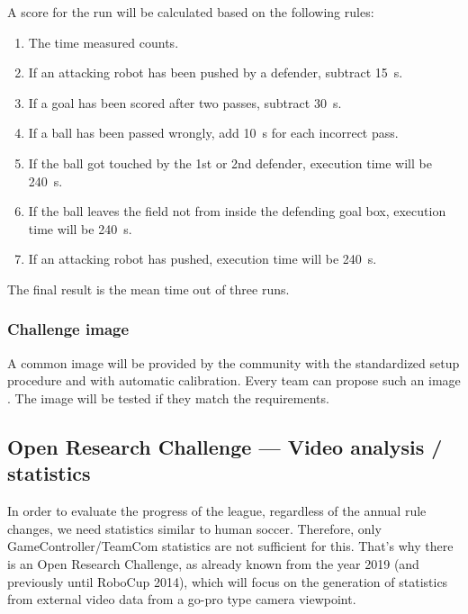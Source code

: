         A score for the run will be calculated based on the following rules:

        \begin{enumerate}
            \item The time measured counts.
            \item If an attacking robot has been pushed by a defender, subtract \qty{15}{\second}.
            \item If a goal has been scored after two passes, subtract \qty{30}{\second}.
            \item If a ball has been passed wrongly, add \qty{10}{\second} for each incorrect pass.
            \item If the ball got touched by the 1st or 2nd defender, execution time will be \qty{240}{\second}.
            \item If the ball leaves the field not from inside the defending goal box, execution time will be \qty{240}{\second}.
            \item If an attacking robot has pushed, execution time will be \qty{240}{\second}.
        \end{enumerate}

        The final result is the mean time out of three runs.

    \subsubsection{Challenge image}
        \label{sec:Challenge_image}
        A common image will be provided by the community with the standardized setup procedure and with automatic calibration. Every team can propose such an image . The image will be tested if they match the requirements.

\subsection{Open Research Challenge — Video analysis / statistics}
In order to evaluate the progress of the league, regardless of the annual rule changes, we need statistics similar to human soccer. Therefore, only GameController/TeamCom statistics are not sufficient for this. That's why there is an Open Research Challenge, as already known from the year 2019 (and previously until RoboCup 2014), which will focus on the generation of statistics from external video data from a go-pro type camera viewpoint.

